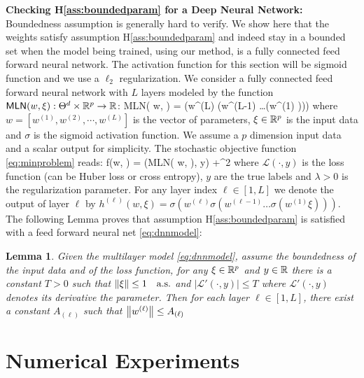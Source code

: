 \documentclass[11pt]{article}
\newtheorem{Lemma}{Lemma}
\theoremstyle{k}
\begin{document}
\textbf{Checking H\ref{ass:boundedparam} for a Deep Neural Network:}
Boundedness assumption is generally hard to verify.
We show here that the weights satisfy assumption H\ref{ass:boundedparam} and indeed stay in a bounded set when the model being trained, using our method, is a fully connected feed forward neural network. 
The activation function for this section will be sigmoid function and we use a $\ell_2$ regularization. 
We consider a fully connected feed forward neural network with $L$ layers modeled by the function $\textsf{MLN}(w, \xi): \Theta^d \times \mathbb{R}^p \to \mathbb{R}$:
\beq\label{eq:dnnmodel}
\textsf{MLN}( w, \xi) = \sigma\left(w^{(L)} \sigma\left(w^{(L-1)} \ldots \sigma\left(w^{(1)} \xi \right)\right)\right)
\eeq
where $w = [w^{(1)}, w^{(2)}, \cdots , w^{(L)}]$ is the vector of parameters, $\xi \in \mathbb{R}^p$ is the input data and $\sigma$ is the sigmoid activation function. We assume a $p$ dimension input data and a scalar output for simplicity.
The stochastic objective function \eqref{eq:minproblem} reads:
\beq\label{eq:lossmln}
f(w, \xi) = (\textsf{MLN}( w, \xi), y) +^2
\eeq
where $\mathcal{L}(\cdot, y)$ is the loss function (can be Huber loss or cross entropy), $y$ are the true labels and $\lambda >0$ is the regularization parameter.
For any layer index $\ell \in [1, L]$ we denote the output of layer $\ell$ by $h^{(\ell)}(w,\xi)= \sigma\left(w^{(\ell)} \sigma\left(w^{(\ell-1)} \ldots \sigma\left(w^{(1)} \xi \right)\right)\right)$.
The following Lemma proves that assumption H\ref{ass:boundedparam} is satisfied with a feed forward neural net \eqref{eq:dnnmodel}:
\begin{Lemma}\label{lem:dnnh2} 
Given the multilayer model \eqref{eq:dnnmodel}, assume the boundedness of the input data and of the loss function, \ie for any $\xi \in \mathbb{R}^p$ and $y \in \mathbb{R}$ there is a constant $T >0$ such that $\left\Vert \xi \right\Vert \leq 1 \quad \textrm{a.s.}$ and $|\mathcal{L}'(\cdot, y)| \leq T$ where $\mathcal{L}'(\cdot, y)$ denotes its derivative \wrt the parameter. Then for each layer $\ell \in [1,L]$, there exist a constant $A_{(\ell)}$ such that $\left\Vert w^{(\ell)} \right\Vert \leq A_{(\ell)}$
\end{Lemma}
\section{Numerical Experiments}\label{sec:numerical}
\end{document}
